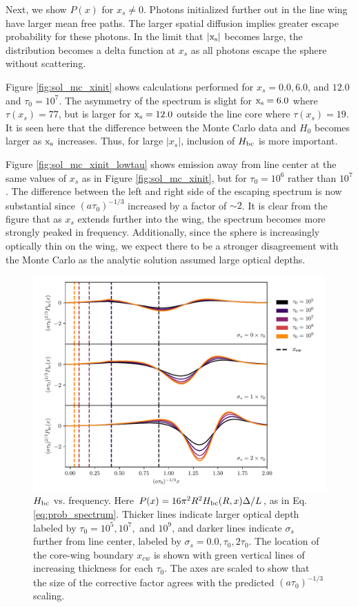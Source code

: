 \documentclass{aastex63}
\begin{document}
Next, we show $P(x)$ for $x_s \neq 0$. Photons initialized further out in the line wing have larger mean free paths. The larger spatial diffusion implies greater escape probability for these photons. In the limit that $|\rm x_s|$ becomes large, the distribution becomes a delta function at $x_s$ as all photons escape the sphere without scattering. 

Figure \ref{fig:sol_mc_xinit} shows calculations performed for $x_s = 0.0, 6.0$, and $12.0$ and $\tau_0=10^7$. The asymmetry of the spectrum is slight for $\rm x_s = 6.0$ where $\tau(x_s)=77$, but is larger for $\rm x_s=12.0$ outside the line core where $\tau(x_s)=19$. It is seen here that the difference between the Monte Carlo data and $H_0$ becomes larger as $\rm x_s$ increases. Thus, for large $|x_s|$, inclusion of $H_{\rm bc}$ is more important.

Figure \ref{fig:sol_mc_xinit_lowtau} shows emission away from line center at the same values of $x_s$ as in Figure \ref{fig:sol_mc_xinit}, but for $\tau_0=10^6$ rather than $10^7$. The difference between the left and right side of the escaping spectrum is now substantial since $(a\tau_0)^{-1/3}$ increased by a factor of ${\sim}2$. It is clear from the figure that as $x_s$ extends further into the wing, the spectrum becomes more strongly peaked in frequency. Additionally, since the sphere is increasingly optically thin on the wing, we expect there to be a stronger disagreement with the Monte Carlo as the analytic solution assumed large optical depths.

\begin{figure}
    \centering
    \includegraphics[width=\textwidth]{xinit.pdf}
    \caption{$H_{\rm bc}$ vs. frequency. Here $P(x) = 16\pi^2R^2H_{\rm bc}(R, x)\Delta/L$, as in Eq. \ref{eq:prob_spectrum}. Thicker lines indicate larger optical depth labeled by $\tau_0=10^5, 10^7,$ and $10^9$, and darker lines indicate $\sigma_s$ further from line center, labeled by $\sigma_s=0.0, \tau_0, 2\tau_0$. The location of the core-wing boundary $x_{cw}$ is shown with green vertical lines of increasing thickness for each $\tau_0$. The axes are scaled to show that the size of the corrective factor agrees with the predicted $(a\tau_0)^{-1/3}$ scaling.}
    \label{fig:xinit}
\end{figure}
\end{document}
